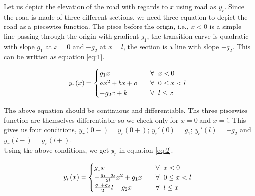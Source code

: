 \documentclass{article}
\begin{document}
    Let us depict the elevation of the road with regards to $x$ using road as $y_{r}$. Since the road is made of three different sections, we need three equation to depict the road as a piecewise function. The piece before the origin, i.e., $x < 0$ is a simple line passing through the origin with gradient $g_{1}$, the transition curve is quadratic with slope $g_{1}$ at $x = 0$ and $-g_{2}$ at $x = l$, the section is a line with slope $-g_{2}$. This can be written as equation \ref{eq:1}.
    
    \begin{equation} \label{eq:1}
        y_{r}(x) = 
            \begin{cases}
                g_{1}x &\quad\forall \hspace{0.2cm} x < 0\\
                ax^{2} + bx + c &\quad\forall \hspace{0.2cm} 0 \leq x < l\\
                -g_{2}x + k &\quad\forall \hspace{0.2cm} l \leq x\\
            \end{cases}    
    \end{equation}
    
    The above equation should be continuous and differentiable. The three piecewise function are themselves differentiable so we check only for $x = 0$ and $x = l$. This gives us four conditions, $y_{r}(0-) = y_{r}(0+)$; $y_{r}'(0) = g_{1}$; $y_{r}'(l) = -g_{2}$ and $y_{r}(l-) = y_{r}(l+)$.\\
    
    Using the above conditions, we get $y_{r}$ in equation \ref{eq:2}.

    \begin{equation} \label{eq:2}
        y_{r}(x) = 
            \begin{cases}
                g_{1}x &\quad\forall \hspace{0.2cm} x < 0\\
                -\frac{g_{1} + g_{2}}{2l}x^{2} + g_{1}x &\quad\forall \hspace{0.2cm} 0 \leq x < l\\
                \frac{g_{1} + g_{2}}{2}l - g_{2}x &\quad\forall \hspace{0.2cm} l \leq x\\
            \end{cases}    
    \end{equation}
    
\end{document}
